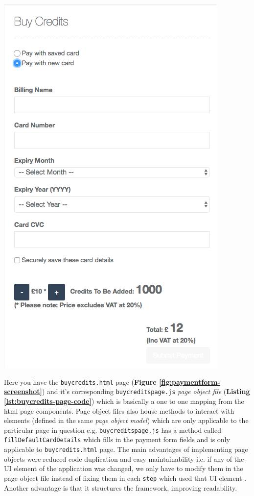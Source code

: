 \begin{minipage}{.49\textwidth}
  \includegraphics[width=\textwidth]{screenshot-payment-form.png}
 	\label{fig:paymentform-screenshot}
\end{minipage}

Here you have the \texttt{buycredits.html} page (\textbf{Figure \ref{fig:paymentform-screenshot}}) and it's corresponding \texttt{buycreditspage.js} \textit{page object file} (\textbf{Listing \ref{lst:buycredits-page-code}}) which is basically a one to one mapping from the html page components. Page object files also house methods to interact with elements (defined in the same \textit{page object model}) which are only applicable to the particular page in question e.g. \texttt{buycreditspage.js} has a method called \texttt{fillDefaultCardDetails} which fills in the payment form fields and is only applicable to \texttt{buycredits.html} page. The main advantages of implementing page objects were reduced code duplication and easy maintainability i.e.  if any of the UI element of the application was changed, we only have to modify them in the page object file instead of fixing them in each \texttt{step} which used that UI element \cite{semaphore}. Another advantage is that it structures the framework, improving readability.

